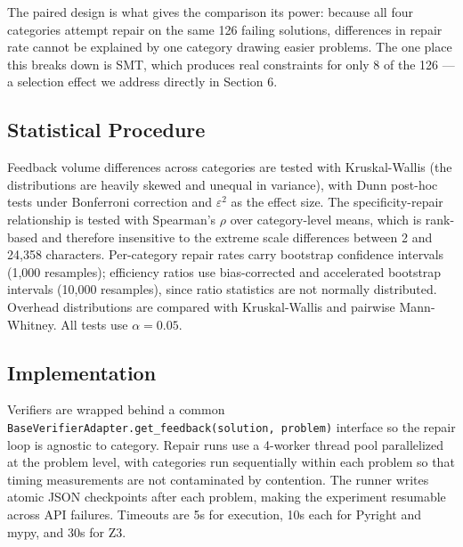 The paired design is what gives the comparison its power: because all four categories attempt repair on the same 126 failing solutions, differences in repair rate cannot be explained by one category drawing easier problems. The one place this breaks down is SMT, which produces real constraints for only 8 of the 126 --- a selection effect we address directly in Section 6.

\subsection{Statistical Procedure}

Feedback volume differences across categories are tested with Kruskal-Wallis (the distributions are heavily skewed and unequal in variance), with Dunn post-hoc tests under Bonferroni correction and $\varepsilon^2$ as the effect size. The specificity-repair relationship is tested with Spearman's $\rho$ over category-level means, which is rank-based and therefore insensitive to the extreme scale differences between 2 and 24,358 characters. Per-category repair rates carry bootstrap confidence intervals (1,000 resamples); efficiency ratios use bias-corrected and accelerated bootstrap intervals (10,000 resamples), since ratio statistics are not normally distributed. Overhead distributions are compared with Kruskal-Wallis and pairwise Mann-Whitney. All tests use $\alpha = 0.05$.

\subsection{Implementation}

Verifiers are wrapped behind a common \texttt{BaseVerifierAdapter.get\_feedback(solution, problem)} interface so the repair loop is agnostic to category. Repair runs use a 4-worker thread pool parallelized at the problem level, with categories run sequentially within each problem so that timing measurements are not contaminated by contention. The runner writes atomic JSON checkpoints after each problem, making the experiment resumable across API failures. Timeouts are 5s for execution, 10s each for Pyright and mypy, and 30s for Z3.
